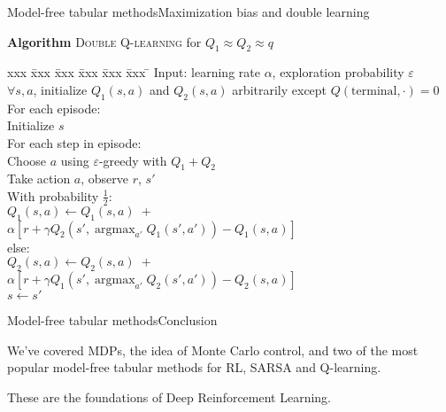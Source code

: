 \documentclass{beamer}
\DeclareMathOperator*{\argmax}{argmax}
\begin{document}
\begin{frame}{Model-free tabular methods}{Maximization bias and double learning}

  \begin{block}{\textbf{Algorithm} \textsc{Double Q-learning} for $Q_1 \approx
      Q_2 \approx q$}
    \begin{tabbing}
      xxx \= xxx \= xxx \= xxx \= xxx \= xxx \= \kill
      Input: learning rate $\alpha$, exploration probability $\varepsilon$ \\
      $\forall s, a$, initialize $Q_1(s,a)$ and $Q_2(s,a)$ arbitrarily
      except $Q(\mathrm{terminal},\cdot) = 0$ \\
      For each episode: \\
      \> Initialize $s$ \\
      \> For each step in episode: \\
      \> \> Choose $a$ using $\varepsilon$-greedy with $Q_1+Q_2$ \\
      \> \> Take action $a$, observe $r$, $s'$ \\
      \> \> With probability $\frac{1}{2}$: \\
      \> \> \> $Q_1(s,a) \leftarrow Q_1(s,a) \; + $ \\
      \> \> \> \> \> \> $\alpha \left[ r + \gamma Q_2(s', \argmax_{a'} Q_1(s', a')) - Q_1(s, a) \right]$ \\
      \> \> else: \\
      \> \> \> $Q_2(s,a) \leftarrow Q_2(s,a) \; + $ \\
      \> \> \> \> \> \> $\alpha \left[ r + \gamma Q_1(s', \argmax_{a'} Q_2(s', a')) - Q_2(s, a) \right]$ \\
      \> \> $s \leftarrow s'$
    \end{tabbing}
  \end{block}

\end{frame}


\begin{frame}{Model-free tabular methods}{Conclusion}

  We've covered MDPs, the idea of Monte Carlo control, and two of
  the most popular model-free tabular methods for RL, SARSA and Q-learning.

  \medskip

  These are the foundations of Deep Reinforcement Learning.

\end{frame}


\end{document}
